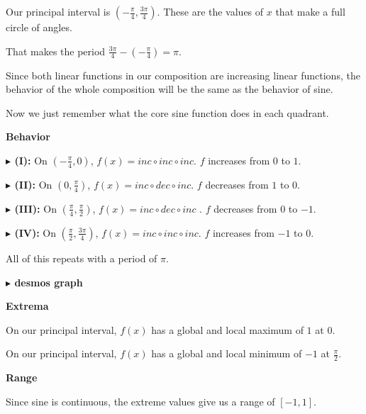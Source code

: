 \documentclass{ximera}
\begin{document}
\begin{example}
Our principal interval is $\left( -\frac{\pi}{4}, \frac{3\pi}{4} \right)$. These are the values of $x$ that make a full circle of angles.

That makes the period $\frac{3\pi}{4} - \left( -\frac{\pi}{4} \right) = \pi$.



Since both linear functions in our composition are increasing linear functions, the behavior of the whole composition will be the same as the behavior of sine.

Now we just remember what the core sine function does in each quadrant. 



\textbf{\textcolor{blue!55!black}{Behavior}} 



\textbf{\textcolor{blue!55!black}{$\blacktriangleright$ (I):}} On $\left( -\frac{\pi}{4}, 0 \right)$, $f(x) = inc \circ inc \circ inc$.  $f$ increases from $0$ to $1$.



\textbf{\textcolor{blue!55!black}{$\blacktriangleright$ (II):}} On $\left( 0, \frac{\pi}{4} \right)$, $f(x) = inc \circ dec \circ inc$. $f$ decreases from $1$ to $0$.



\textbf{\textcolor{blue!55!black}{$\blacktriangleright$ (III):}} On $\left( \frac{\pi}{4}, \frac{\pi}{2} \right)$, $f(x) = inc \circ dec \circ inc$ . $f$ decreases from $0$ to $-1$.


\textbf{\textcolor{blue!55!black}{$\blacktriangleright$ (IV):}} On $\left( \frac{\pi}{2}, \frac{3\pi}{4} \right)$, $f(x) = inc \circ inc \circ inc$. $f$ increases from $-1$ to $0$.



All of this repeats with a period of $\pi$.












\textbf{\textcolor{blue!55!black}{$\blacktriangleright$ desmos graph}} 
\begin{center}
\end{center}






\textbf{\textcolor{blue!55!black}{Extrema}} 


On our principal interval, $f(x)$ has a global and local maximum of $1$ at $0$.


On our principal interval, $f(x)$ has a global and local minimum of $-1$ at $\frac{\pi}{2}$.




\textbf{\textcolor{blue!55!black}{Range}} 

Since sine is continuous, the extreme values give us a range of $[-1,1]$.



\end{example}
\end{document}
